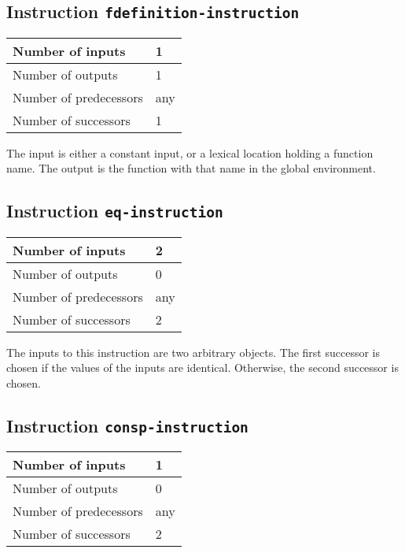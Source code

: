 \subsection{Instruction \texttt{fdefinition-instruction}}
\label{hir-instruction-fdefinition}

\begin{tabular}{|l|l|}
  \hline
  Number of inputs & 1\\
  \hline
  Number of outputs & 1\\
  \hline
  Number of predecessors & any\\
  \hline
  Number of successors & 1\\
  \hline
\end{tabular}

The input is either a constant input, or a lexical location holding a
function name. The output is the function with that name in the global
environment.

\subsection{Instruction \texttt{eq-instruction}}
\label{hir-instruction-eq}

\begin{tabular}{|l|l|}
\hline
Number of inputs & 2\\
\hline
Number of outputs & 0\\
\hline
Number of predecessors & any\\
\hline
Number of successors & 2\\
\hline
\end{tabular}

The inputs to this instruction are two arbitrary \commonlisp{}
objects.  The first successor is chosen if the values of the inputs
are identical.  Otherwise, the second successor is chosen.

\subsection{Instruction \texttt{consp-instruction}}
\label{hir-instruction-car}

\begin{tabular}{|l|l|}
\hline
Number of inputs & 1\\
\hline
Number of outputs & 0\\
\hline
Number of predecessors & any\\
\hline
Number of successors & 2\\
\hline
\end{tabular}

